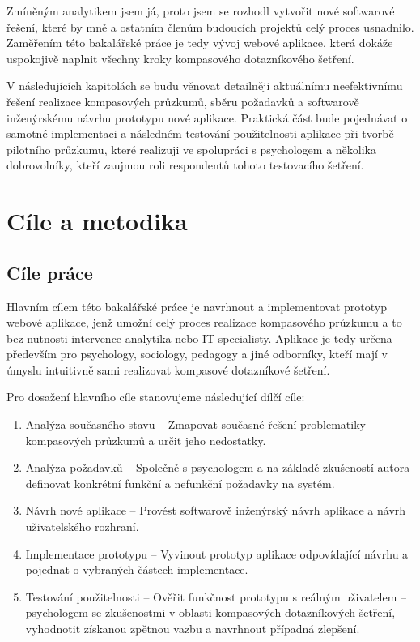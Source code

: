 Zmíněným analytikem jsem já, proto jsem se rozhodl vytvořit nové softwarové řešení, které by mně a ostatním členům budoucích projektů celý proces usnadnilo. 
Zaměřením této bakalářské práce je tedy vývoj webové aplikace, která dokáže uspokojivě naplnit všechny kroky kompasového dotazníkového šetření.

V následujících kapitolách se budu věnovat detailněji aktuálnímu neefektivnímu řešení realizace kompasových průzkumů, sběru požadavků a softwarově inženýrskému návrhu 
prototypu nové aplikace. Praktická část bude pojednávat o samotné implementaci a následném testování použitelnosti aplikace při tvorbě pilotního průzkumu, 
které realizuji ve spolupráci s psychologem a několika dobrovolníky, kteří zaujmou roli respondentů tohoto testovacího šetření.


\chapter*{Cíle a metodika}

\section*{Cíle práce}
Hlavním cílem této bakalářské práce je navrhnout a implementovat prototyp webové aplikace, jenž umožní celý 
proces realizace kompasového průzkumu a to bez nutnosti intervence analytika nebo IT specialisty. 
Aplikace je tedy určena především pro psychology, sociology, pedagogy a jiné odborníky, kteří mají 
v úmyslu intuitivně sami realizovat kompasové dotazníkové šetření.

Pro dosažení hlavního cíle stanovujeme následující dílčí cíle:
\begin{enumerate}
    \item Analýza současného stavu – Zmapovat současné řešení problematiky kompasových průzkumů a určit jeho nedostatky.
    \item Analýza požadavků – Společně s psychologem a na základě zkušeností autora definovat konkrétní funkční a nefunkční požadavky na systém.
    \item Návrh nové aplikace – Provést softwarově inženýrský návrh aplikace a návrh uživatelského rozhraní.
    \item Implementace prototypu – Vyvinout prototyp aplikace odpovídající návrhu a pojednat o vybraných částech implementace. 
    \item Testování použitelnosti – Ověřit funkčnost prototypu s reálným uživatelem – psychologem se 
    zkušenostmi v oblasti kompasových dotazníkových šetření, vyhodnotit získanou zpětnou vazbu a navrhnout případná zlepšení.
\end{enumerate}

